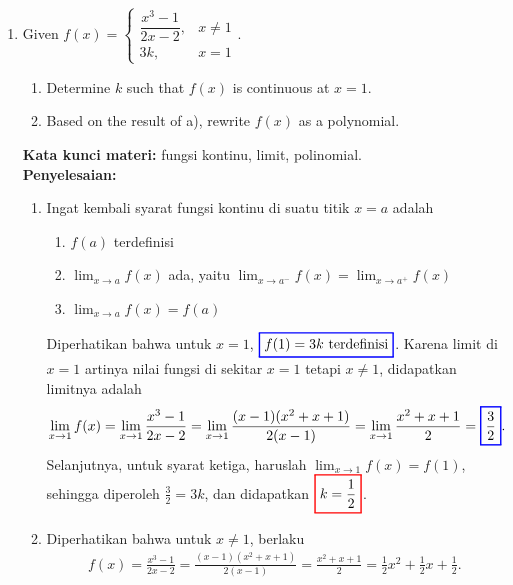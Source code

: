 \documentclass[10pt,openany,a4paper]{article}
\theoremstyle{definition}
\theoremstyle{definition}
\theoremstyle{plain}
\newenvironment{jawab}[2][tes]{%
\par\noindent\textbf{Kata kunci materi:} #1.\\
\textbf{Penyelesaian:} #2%
}{}
\begin{document}
\begin{enumerate}
    \item Given $f(x)=\begin{cases}
        \dfrac{x^3-1}{2x-2}, & x\neq 1\\
        3k, & x=1
    \end{cases}$.
    \begin{enumerate}
        \item[a.] Determine $k$ such that $f(x)$ is continuous at $x=1$.
        \item[b.] Based on the result of a), rewrite $f(x)$ as a polynomial.
    \end{enumerate}
    \begin{jawab}[fungsi kontinu, limit, polinomial]{
        \begin{enumerate}
            \item Ingat kembali syarat fungsi kontinu di suatu titik \(x = a\) adalah
            \begin{enumerate}
                \item \(f(a)\) terdefinisi
                \item \(\displaystyle \lim_{x \to a} f(x)\) ada, yaitu $\displaystyle \lim_{x \to a^-} f(x) = \lim_{x \to a^+} f(x)$
                \item \(\displaystyle\lim_{x \to a} f(x) = f(a)\)
            \end{enumerate}
            Diperhatikan bahwa untuk \(x = 1\), $\colorlet{oldcolor}{.}
        \color{blue}
        \setlength{\fboxrule}{1pt} \boxed{\color{oldcolor}f(1) = 3k~\text{terdefinisi}}\color{oldcolor}$. Karena limit di $x=1$ artinya nilai fungsi di sekitar $x=1$ tetapi $x\neq 1$, didapatkan limitnya adalah
            \begin{align*}
            \lim_{x \to 1} f(x) = \lim_{x \to 1} \frac{x^3 - 1}{2x - 2} = \lim_{x \to 1} \frac{(x-1)(x^2 + x + 1)}{2(x-1)} = \lim_{x \to 1} \frac{x^2 + x + 1}{2} = \colorlet{oldcolor}{.}
        \color{blue}
        \setlength{\fboxrule}{1pt} \boxed{\color{oldcolor}\frac{3}{2}}\color{oldcolor}.
            \end{align*}
            Selanjutnya, untuk syarat ketiga, haruslah $\displaystyle\lim_{x \to 1} f(x) = f(1)$, sehingga diperoleh $\frac{3}{2} = 3k$, dan didapatkan $\colorlet{oldcolor}{.}
        \color{red}
        \setlength{\fboxrule}{1pt} \boxed{\color{oldcolor}k=\frac{1}{2}}\color{oldcolor}$.
        \item Diperhatikan bahwa untuk $x\neq 1$, berlaku
        \begin{align*}
            f(x) = \frac{x^3 - 1}{2x - 2} = \frac{(x-1)(x^2 + x + 1)}{2(x-1)} = \frac{x^2 + x + 1}{2} = \frac{1}{2}x^2 + \frac{1}{2}x + \frac{1}{2}.

\end{align*}
\end{enumerate}}
\end{jawab}
\end{enumerate}
\end{document}
